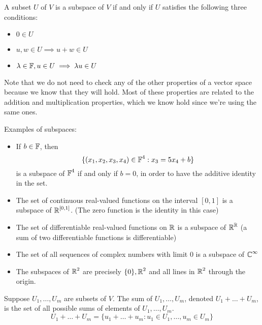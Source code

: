 \begin{definition}
    A subset $U$ of $V$ is a subspace of $V$ if and only if $U$ satisfies the following
    three conditions:
    \begin{itemize}
        \item $0 \in U$
        \item $u, w \in U \implies u + w \in U$
        \item $\lambda \in \operatorname{\mathbb{F}}, u \in U \implies \lambda u \in U$
    \end{itemize}
\end{definition}

Note that we do not need to check any of the other properties of a vector
space because we know that they will hold. Most of these properties are related
to the addition and multiplication properties, which we know hold since we're using
the same ones.

\begin{example} Examples of subspaces:
    \begin{itemize}
        \item If $b \in \operatorname{\mathbb{F}}$, then
        \[ \{ (x_1, x_2, x_3, x_4) \in \operatorname{\mathbb{F}}^4 : x_3 = 5x_4 + b \} \]
        is a subspace of $\operatorname{\mathbb{F}}^4$ if and only if $b = 0$, in order to have
        the additive identity in the set.

        \item The set of continuous real-valued functions on the interval $[0,1]$
        is a subspace of $\operatorname{\mathbb{R}}^{[0,1]}$. (The zero function is the identity in this case)

        \item The set of differentiable real-valued functions on $\operatorname{\mathbb{R}}$ is a subspace 
        of $\operatorname{\mathbb{R}}^{\operatorname{\mathbb{R}}}$ (a sum of two differentiable functions is differentiable)

        \item The set of all sequences of complex numbers with limit 0 is a subspace
        of $\operatorname{\mathbb{C}}^{\infty}$

        \item The subspaces of $\operatorname{\mathbb{R}}^2$ are precisely $\{0\}, \operatorname{\mathbb{R}}^2$ and all lines in $\operatorname{\mathbb{R}}^2$
        through the origin.
    \end{itemize}
    
\end{example}

\begin{definition}
    Suppose $U_1, \ldots, U_m$ are subsets of $V$. The sum of $U_1, \ldots, U_m$, denoted
    $U_1 + \ldots + U_m$, is the set of all possible sums of elements of $U_1, \ldots, U_m$.
    \[ U_1 + \ldots + U_m = \{u_1 + \dots + u_m : u_1 \in U_1, \ldots, u_m \in U_m \} \]
\end{definition}

